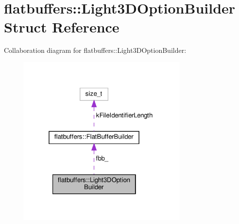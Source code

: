 \hypertarget{structflatbuffers_1_1Light3DOptionBuilder}{}\section{flatbuffers\+:\+:Light3\+D\+Option\+Builder Struct Reference}
\label{structflatbuffers_1_1Light3DOptionBuilder}


Collaboration diagram for flatbuffers\+:\+:Light3\+D\+Option\+Builder\+:
\nopagebreak
\begin{figure}[H]
\begin{center}
\leavevmode
\includegraphics[width=241pt]{structflatbuffers_1_1Light3DOptionBuilder__coll__graph}
\end{center}
\end{figure}
